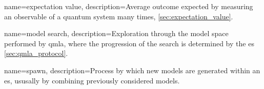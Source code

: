 





{
    name=expectation value,
    description={Average outcome expected by measuring an observable of a quantum system many times, \cref{sec:expectation_value}.}
}

{
    name=model search,
    description={Exploration through the \gls{model space} performed by \acrshort{qmla}, where the progression of the search is determined by the \acrshort{es} \cref{sec:qmla_protocol}.}
}

{
    name=spawn,
    description={Process by which new models are generated within an \acrshort{es}, ususally by combining previously considered models.}
}

